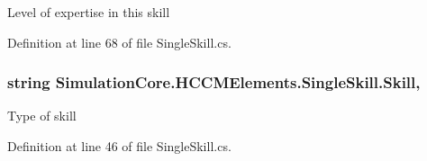 Level of expertise in this skill 



Definition at line 68 of file Single\+Skill.\+cs.

\subsubsection[{\texorpdfstring{Skill}{Skill}}]{\setlength{\rightskip}{0pt plus 5cm}string Simulation\+Core.\+H\+C\+C\+M\+Elements.\+Single\+Skill.\+Skill\hspace{0.3cm}{\ttfamily [get]}, {\ttfamily [set]}}\hypertarget{class_simulation_core_1_1_h_c_c_m_elements_1_1_single_skill_afcee9b43de1b557943d1665e349ee9f8}{}\label{class_simulation_core_1_1_h_c_c_m_elements_1_1_single_skill_afcee9b43de1b557943d1665e349ee9f8}


Type of skill 



Definition at line 46 of file Single\+Skill.\+cs.

